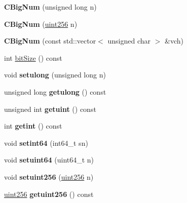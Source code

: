 \begin{DoxyCompactItemize}
\mbox{\label{class_c_big_num_ab10a8c87dd0e8ca79f67df75ca7e7ecc}} 
{\bfseries C\+Big\+Num} (unsigned long n)
\item 
\mbox{\label{class_c_big_num_a47684495c159d6279490151ae4497332}} 
{\bfseries C\+Big\+Num} (\mbox{\hyperlink{classuint256}{uint256}} n)
\item 
\mbox{\label{class_c_big_num_ad3c2843e6755a612b8734eb6e0f03ced}} 
{\bfseries C\+Big\+Num} (const std\+::vector$<$ unsigned char $>$ \&vch)
\item 
int \mbox{\hyperlink{class_c_big_num_ab4b035b81263dcba7b996997ecdcea8d}{bit\+Size}} () const
\item 
\mbox{\label{class_c_big_num_ac8c00c696d9cbd3fa309a2d0a6bc4b1d}} 
void {\bfseries setulong} (unsigned long n)
\item 
\mbox{\label{class_c_big_num_a035dfd4984c0dfb5400e83afa11e0d21}} 
unsigned long {\bfseries getulong} () const
\item 
\mbox{\label{class_c_big_num_a50e032d16c3d6a4c7a12e21b55ef8ae5}} 
unsigned int {\bfseries getuint} () const
\item 
\mbox{\label{class_c_big_num_afc4744c69da2e73b6e6a8941abf6d244}} 
int {\bfseries getint} () const
\item 
\mbox{\label{class_c_big_num_aca73fa36a797c91b30515ae61cc5d765}} 
void {\bfseries setint64} (int64\+\_\+t sn)
\item 
\mbox{\label{class_c_big_num_ae61a86bfe3b286a2cfda45ffba1c1310}} 
void {\bfseries setuint64} (uint64\+\_\+t n)
\item 
\mbox{\label{class_c_big_num_ade94c52f2f5d5a20e605125fcf727a34}} 
void {\bfseries setuint256} (\mbox{\hyperlink{classuint256}{uint256}} n)
\item 
\mbox{\label{class_c_big_num_a0acdf0ee722fe320e961863b792bf609}} 
\mbox{\hyperlink{classuint256}{uint256}} {\bfseries getuint256} () const

\end{DoxyCompactItemize}
